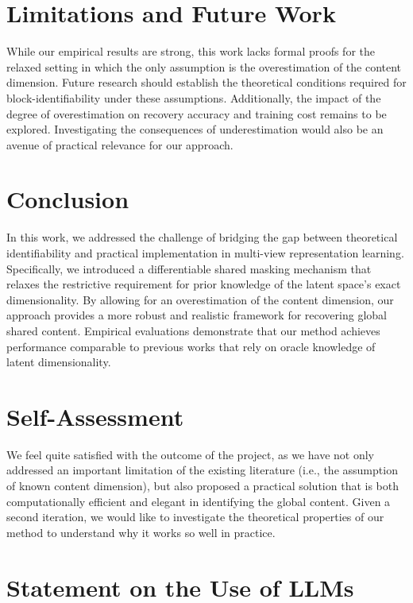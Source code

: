 \documentclass[a4paper,12pt]{article}
\begin{document}
\section{Limitations and Future Work}
While our empirical results are strong, this work lacks formal proofs for the relaxed setting in which the only assumption is the overestimation of the content dimension.
Future research should establish the theoretical conditions required for block-identifiability under these assumptions.
Additionally, the impact of the degree of overestimation on recovery accuracy and training cost remains to be explored. Investigating the consequences of underestimation would also be an avenue of practical relevance for our approach.

\section{Conclusion}
In this work, we addressed the challenge of bridging the gap between theoretical identifiability and practical implementation in multi-view representation learning. Specifically, we introduced a differentiable shared masking mechanism that relaxes the restrictive requirement for prior knowledge of the latent space's exact dimensionality. By allowing for an overestimation of the content dimension, our approach provides a more robust and realistic framework for recovering global shared content. Empirical evaluations demonstrate that our method achieves performance comparable to previous works \cite{daunhawer2023identifiabilityresultsmultimodalcontrastive, yao2024multiviewcausalrepresentationlearning} that rely on oracle knowledge of latent dimensionality.

\newpage
\section*{Self-Assessment}

We feel quite satisfied with the outcome of the project, as we have not only addressed an important limitation of the existing literature (i.e., the assumption of known content dimension), but also proposed a practical solution that is both computationally efficient and elegant in identifying the global content. Given a second iteration, we would like to investigate the theoretical properties of our method to understand why it works so well in practice.

\section*{Statement on the Use of LLMs}
\end{document}

